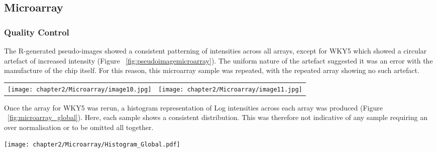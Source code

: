 \subsection{Microarray}

\subsubsection{Quality Control}

The R-generated pseudo-images showed a consistent patterning of intensities across all arrays, except for WKY5 which showed a circular artefact of increased intensity (Figure ~\ref{fig:pseudoimagemicroarray}). The uniform nature of the artefact suggested it was an error with the manufacture of the chip itself. For this reason, this microarray sample was repeated, with the repeated array showing no such artefact. \\

\begin{figure*}[!htbp]
\centering
\begin{tabular}{cc}
\texttt{[image: chapter2/Microarray/image10.jpg]} & \texttt{[image: chapter2/Microarray/image11.jpg]} \\
\end{tabular}
\caption[Quality control generated Pseudo-images of Microarray Gene Chips]{Quality control generated Pseudo-images of Microarray Gene Chips of sample WKY4 (left) and WKY5 (right). Here, a clear artefact can be seen in the WKY5 sample in the shape of a ring around the chip. The artefact appears to be a defect within the gene chip, and one that was possibly the result of a loading or manufacture error. This sample was subsequently re-ran before inclusion in the experiment.}
\label{fig:pseudoimagemicroarray}
\end{figure*}

Once the array for WKY5 was rerun, a histogram representation of Log intensities across each array was produced (Figure ~\ref{fig:microarray_global}). Here, each sample shows a consistent distribution. This was therefore not indicative of any sample requiring an over normalisation or to be omitted all together. 

\begin{figure*}[!htbp]
\centering
\texttt{[image: chapter2/Microarray/Histogram\_Global.pdf]}
\caption[Global Histogram of Microarray Intensities]{Histogram showing the Log intensities across the chip for all arrays. Here a uniform distribution of intensities across can be seen across all chips. Therefore, this \acrshort{qc} metric does not highlight any causes for concern at this stage of the QC pipeline.}
\label{fig:microarray_global}
\end{figure*}

